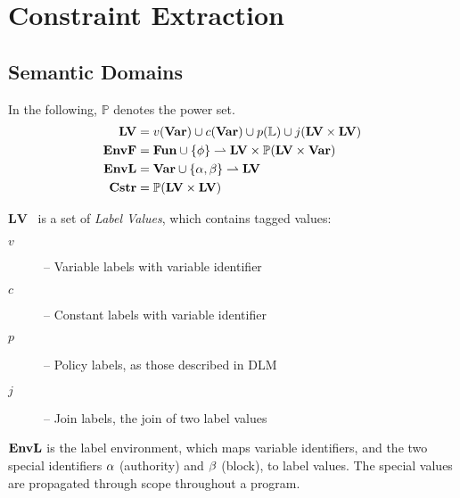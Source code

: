 
\newcommand{\iR}{\mathcal{R}}
\newcommand{\iD}{\mathcal{D}}
\newcommand{\iV}{\mathcal{V}}
\newcommand{\iF}{\mathcal{F}}
\newcommand{\iS}{\mathcal{S}}
\newcommand{\iE}{\mathcal{E}}
\newcommand{\iL}{\mathcal{L}}
\newcommand{\iO}{\mathcal{O}}

\newcommand{\iLV}{\mathbf{LV}}
\newcommand{\ilv}{lv}

\newcommand{\dblSq}[1]{[\![ #1 ]\!]}

\newcommand{\rspace}{\\[1em]}
\newcommand{\dsWhere}[1]{\quad \text{ where } #1}
\newcommand{\dsAnd}[1]{\quad \text{ and } #1}
\newcommand{\dsIf}[1]{\quad \text{ if } #1}

\section{Constraint Extraction}

\subsection{Semantic Domains}
In the following, $\mathbb P$ denotes the power set.
\begin{align*}
\iLV    & = v(\iVar) \cup c(\iVar) \cup p(\mathbb{L}) \cup j(\iLV \times \iLV) \\
\iEnvF  & = \iFun \cup \{ \ifb \} \rightharpoonup \iLV \times \mathbb P (\iLV \times \iVar) \\
\iEnvL  & = \iVar \cup \{ \ia, \ib \} \rightharpoonup \iLV \\
\iCstr  & = \mathbb P (\iLV \times \iLV)
\end{align*}

$\iLV$~ is a set of \emph{Label Values}, which contains tagged values:
\begin{description}
  \item[$v$] -- Variable labels with variable identifier
  \item[$c$] -- Constant labels with variable identifier
  \item[$p$] -- Policy labels, as those described in DLM
  \item[$j$] -- Join labels, the join of two label values
\end{description}

$\mathbf{EnvL}$ is the label environment, which maps variable identifiers, and the two special identifiers $\alpha$ (authority) and $\beta$ (block), to label values.
The special values are propagated through scope throughout a program.

